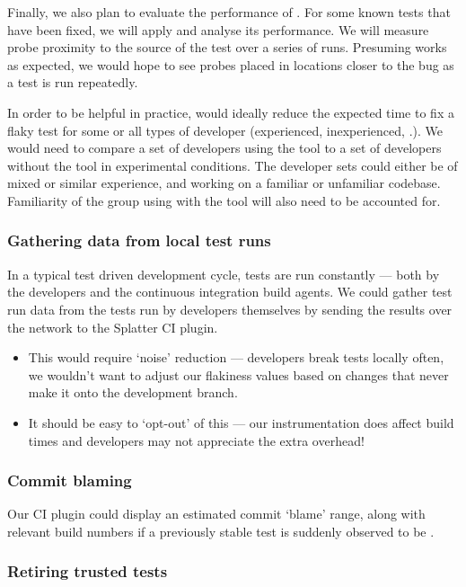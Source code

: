 Finally, we also plan to evaluate the performance of \splatter. For some known \flaky tests that have been fixed, we will apply \splatter and analyse its performance. We will measure probe proximity to the source of the \flaky test over a series of runs. Presuming \splatter works as expected, we would hope to see probes placed in locations closer to the bug as a test is run repeatedly.

In order to be helpful in practice, \splatter would ideally reduce the expected time to fix a flaky test for some or all types of developer (experienced, inexperienced, \etc.). We would need to compare a set of developers using the tool to a set of developers without the tool in experimental conditions. The developer sets could either be of mixed or similar experience, and working on a familiar or unfamiliar codebase. Familiarity of the group using \splatter with the tool will also need to be accounted for.

\subsubsection{Gathering data from local test runs}

In a typical test driven development cycle, tests are run constantly --- both by the developers and the continuous integration build agents. We could gather test run data from the tests run by developers themselves by sending the results over the network to the Splatter CI plugin.

\begin{itemize}
	\item This would require {\lq}noise{\rq} reduction --- developers break tests locally often, we wouldn't want to adjust our flakiness values based on changes that never make it onto the development branch.
	\item It should be easy to {\lq}opt-out{\rq} of this --- our instrumentation does affect build times and developers may not appreciate the extra overhead!
\end{itemize}

\subsubsection{Commit blaming}

Our CI plugin could display an estimated commit {\lq}blame{\rq} range, along with relevant build numbers if a previously stable test is suddenly observed to be \flaky.

\subsubsection{Retiring trusted tests}

